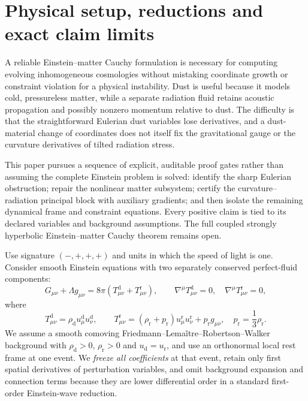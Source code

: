 \documentclass[11pt,a4paper]{article}
\begin{document}
\section{Physical setup, reductions and exact claim limits}
A reliable Einstein--matter Cauchy formulation is necessary for
computing evolving inhomogeneous cosmologies without mistaking
coordinate growth or constraint violation for a physical
instability. Dust is useful because it models cold, pressureless
matter, while a separate radiation fluid retains acoustic
propagation and possibly nonzero momentum relative to dust.
The difficulty is that the straightforward Eulerian dust
variables lose derivatives, and a dust-material change of
coordinates does not itself fix the gravitational gauge or
the curvature derivatives of tilted radiation stress.

This paper pursues a sequence of explicit, auditable proof
gates rather than assuming the complete Einstein problem is
solved: identify the sharp Eulerian obstruction; repair the
nonlinear matter subsystem; certify the curvature--radiation
principal block with auxiliary gradients; and then isolate
the remaining dynamical frame and constraint equations.
Every positive claim is tied to its declared variables and
background assumptions. The full coupled strongly
hyperbolic Einstein--matter Cauchy theorem remains open.

Use signature $(-,+,+,+)$ and units in which the speed of light is one. Consider smooth Einstein equations with two separately conserved perfect-fluid components:
\begin{equation}\label{eq:Einstein}
G_{\mu\nu}+\Lambda g_{\mu\nu}=8\pi(T^{\mathrm d}_{\mu\nu}+T^{\mathrm r}_{\mu\nu}),
\qquad \nabla^\mu T^{\mathrm d}_{\mu\nu}=0,\quad
\nabla^\mu T^{\mathrm r}_{\mu\nu}=0,
\end{equation}
where
\begin{equation}\label{eq:stress}
T^{\mathrm d}_{\mu\nu}=\rho_{\mathrm d}u^{\mathrm d}_\mu u^{\mathrm d}_\nu,\qquad
T^{\mathrm r}_{\mu\nu}=(\rho_{\mathrm r}+p_{\mathrm r})
u^{\mathrm r}_\mu u^{\mathrm r}_\nu+p_{\mathrm r}g_{\mu\nu},\quad
p_{\mathrm r}=\frac13\rho_{\mathrm r}.
\end{equation}
We assume a smooth comoving Friedmann--Lema\^itre--Robertson--Walker
background with $\rho_{\mathrm d}>0$, $\rho_{\mathrm r}>0$ and
$u_{\mathrm d}=u_{\mathrm r}$, and use an orthonormal local rest frame
at one event. We \emph{freeze all coefficients} at that event,
retain only first spatial derivatives of perturbation variables,
and omit background expansion and connection terms because they
are lower differential order in a standard first-order
Einstein-wave reduction.
\end{document}
